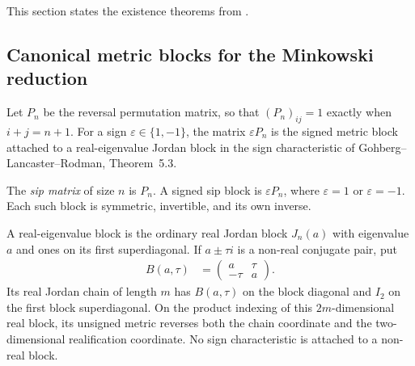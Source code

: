 This section states the existence theorems from
\cite[Section~2.4]{Wolf2012Quantum}.

\subsection{Canonical metric blocks for the Minkowski reduction}

Let $P_n$ be the reversal permutation matrix, so that
$(P_n)_{ij}=1$ exactly when $i+j=n+1$.  For a sign
$\varepsilon\in\{1,-1\}$, the matrix $\varepsilon P_n$ is the signed
metric block attached to a real-eigenvalue Jordan block in the sign
characteristic of Gohberg--Lancaster--Rodman, Theorem~5.3.

\begin{definition}\label{def:signed_sip_metric_blocks}
    \leanok
    The \emph{sip matrix} of size $n$ is $P_n$.  A signed sip block is
    $\varepsilon P_n$, where $\varepsilon=1$ or $\varepsilon=-1$.
    Each such block is symmetric, invertible, and its own inverse.
\end{definition}

\begin{definition}\label{def:real_canonical_jordan_blocks}
    \leanok
    A real-eigenvalue block is the ordinary real Jordan block $J_n(a)$
    with eigenvalue $a$ and ones on its first superdiagonal.  If
    $a\pm\tau i$ is a non-real conjugate pair, put
    \begin{align}
        B(a,\tau)&=\begin{pmatrix}a&\tau\\-\tau&a\end{pmatrix}.
    \end{align}
    Its real Jordan chain of length $m$ has $B(a,\tau)$ on the block
    diagonal and $I_2$ on the first block superdiagonal.  On the product
    indexing of this $2m$-dimensional real block, its unsigned metric
    reverses both the chain coordinate and the two-dimensional
    realification coordinate.  No sign characteristic is attached to a
    non-real block.
\end{definition}

